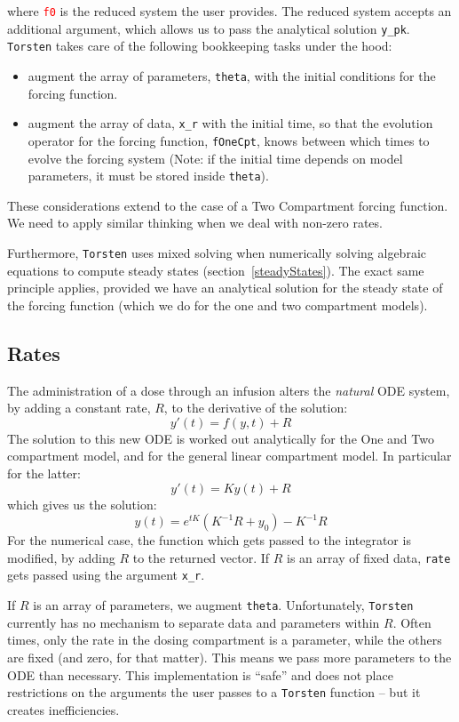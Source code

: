 \documentclass[11pt]{article}
\begin{document}
%
where \texttt{\textcolor{red}{f0}} is the reduced system the user provides. The reduced 
system accepts an additional argument, which allows us to pass the analytical solution \texttt{y\_pk}. 
\texttt{Torsten} takes care of the following bookkeeping tasks under the hood:
\begin{itemize}
  \item augment the array of parameters, \texttt{theta}, with the initial conditions for the forcing function.
  \item augment the array of data, \texttt{x\_r} with the initial time, so that the evolution operator
  for the forcing function, \texttt{fOneCpt}, knows between which times to evolve the forcing system
  (Note: if the initial time depends on model parameters, it must be stored inside \texttt{theta}).
\end{itemize}
%
These considerations extend to the case of a Two Compartment forcing function. We need to apply 
similar thinking when we deal with non-zero rates.

Furthermore, \texttt{Torsten} uses mixed solving when numerically solving algebraic
equations to compute steady states (section~\ref{steadyStates}).
The exact same principle applies, provided we have an analytical solution for the steady state
of the forcing function (which we do for the one and two compartment models).

\subsection{Rates}

The administration of a dose through an infusion alters the \textit{natural} ODE system, by 
adding a constant rate, $R$, to the derivative of the solution:
%
$$
y'(t) = f(y, t) + R
$$
%
The solution to this new ODE is worked out analytically for the One and Two compartment 
model, and for the general linear compartment model. In particular for the latter:
%
$$
y'(t) = K y(t) + R
$$
%
which gives us the solution:
%
$$
y(t) = e^{tK} (K^{-1}R + y_0) - K^{-1} R
$$ 
%
For the numerical case, the function which gets passed to the integrator is modified, by adding
 $R$ to the returned vector. If $R$ is an array of fixed data, \texttt{rate} gets passed using the argument
 \texttt{x\_r}.

If $R$ is an array of parameters, we augment \texttt{theta}. Unfortunately, \texttt{Torsten} currently has 
no mechanism to separate data and parameters within $R$. Often times, only the rate in the dosing
compartment is a parameter, while the others are fixed (and zero, for that matter). This means we 
pass more parameters to the ODE  than necessary. This implementation is ``safe'' and does not place
restrictions on the arguments the user passes to a \texttt{Torsten} function -- but it creates inefficiencies.
\end{document}
